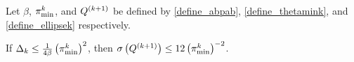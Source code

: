 % 



\begin{lemma}
\label{boundbeta}
Let $\beta$, ${\pi^k_{\textrm{min}}}$, and ${Q^{(k+1)}}$ be defined by \cref{define_abpab}, \cref{define_thetamink}, and \cref{define_ellipsek} respectively.

If $\Delta_k \le \frac 1 {4 \beta} \left({\pi^k_{\textrm{min}}}\right)^2$, then ${\sigma} \left({Q^{(k+1)}}\right) \le 12 \left({\pi^k_{\textrm{min}}}\right)^{-2}$.

\end{lemma}

